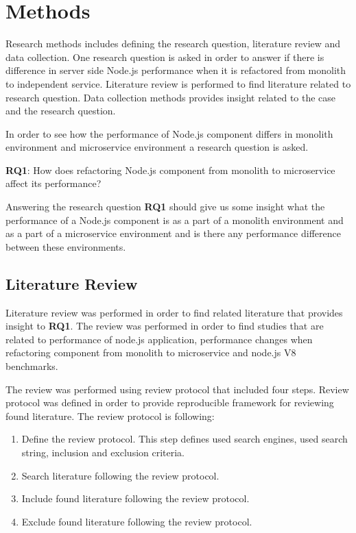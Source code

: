 \chapter{Methods\label{methods}}
Research methods includes defining the research question, literature review and data collection.
One research question is asked in order to answer if there is difference in server side Node.js performance when it is refactored from monolith to independent service.
Literature review is performed to find literature related to research question.
Data collection methods provides insight related to the case and the research question.

In order to see how the performance of Node.js component differs in monolith environment and microservice environment a research question is asked.

\textbf{RQ1}: How does refactoring Node.js component from monolith to microservice affect its performance?

Answering the research question \textbf{RQ1} should give us some insight what the performance of a Node.js component is as a part of a monolith environment and as a part of a microservice environment and is there any performance difference between these environments.

\section{Literature Review}
Literature review was performed in order to find related literature that provides insight to \textbf{RQ1}.
The review was performed in order to find studies that are related to performance of node.js application, performance changes when refactoring component from monolith to microservice and node.js V8 benchmarks.

The review was performed using review protocol that included four steps.
Review protocol was defined in order to provide reproducible framework for reviewing found literature.
The review protocol is following:
\begin{enumerate}
    \item Define the review protocol. This step defines used search engines, used search string, inclusion and exclusion criteria.
    \item Search literature following the review protocol.
    \item Include found literature following the review protocol.
    \item Exclude found literature following the review protocol.
\end{enumerate}

